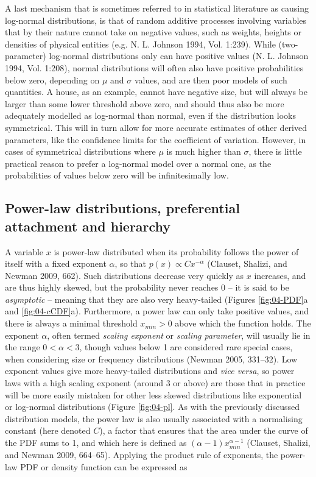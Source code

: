 \documentclass[
  12pt,
  a4paper, twoside]{book}
\begin{document}
A last mechanism that is sometimes referred to in statistical literature as causing log-normal distributions, is that of random additive processes involving variables that by their nature cannot take on negative values, such as weights, heights or densities of physical entities (e.g. N. L. Johnson 1994, Vol. 1:239). While (two-parameter) log-normal distributions only can have positive values (N. L. Johnson 1994, Vol. 1:208), normal distributions will often also have positive probabilities below zero, depending on \(\mu\) and \(\sigma\) values, and are then poor models of such quantities. A house, as an example, cannot have negative size, but will always be larger than some lower threshold above zero, and should thus also be more adequately modelled as log-normal than normal, even if the distribution looks symmetrical. This will in turn allow for more accurate estimates of other derived parameters, like the confidence limits for the coefficient of variation. However, in cases of symmetrical distributions where \(\mu\) is much higher than \(\sigma\), there is little practical reason to prefer a log-normal model over a normal one, as the probabilities of values below zero will be infinitesimally low.

\FloatBarrier

\hypertarget{power-law}{%
\subsection{Power-law distributions, preferential attachment and hierarchy}\label{power-law}}

A variable \(x\) is power-law distributed when its probability follows the power of itself with a fixed exponent \(\alpha\), so that \(p(x) \propto Cx^{-\alpha}\) (Clauset, Shalizi, and Newman 2009, 662). Such distributions decrease very quickly as \(x\) increases, and are thus highly skewed, but the probability never reaches 0 -- it is said to be \emph{asymptotic} -- meaning that they are also very heavy-tailed (Figures \ref{fig:04-PDF}a and \ref{fig:04-cCDF}a). Furthermore, a power law can only take positive values, and there is always a minimal threshold \(x_{min} > 0\) above which the function holds. The exponent \(\alpha\), often termed \emph{scaling exponent} or \emph{scaling parameter}, will usually lie in the range \(0 < \alpha < 3\), though values below 1 are considered rare special cases, when considering size or frequency distributions (Newman 2005, 331--32). Low exponent values give more heavy-tailed distributions and \emph{vice versa}, so power laws with a high scaling exponent (around 3 or above) are those that in practice will be more easily mistaken for other less skewed distributions like exponential or log-normal distributions (Figure \ref{fig:04-pl}. As with the previously discussed distribution models, the power law is also usually associated with a normalising constant (here denoted \(C\)), a factor that ensures that the area under the curve of the PDF sums to 1, and which here is defined as \((\alpha-1)x_{min}^{\alpha-1}\) (Clauset, Shalizi, and Newman 2009, 664--65). Applying the product rule of exponents, the power-law PDF or density function can be expressed as
\end{document}

